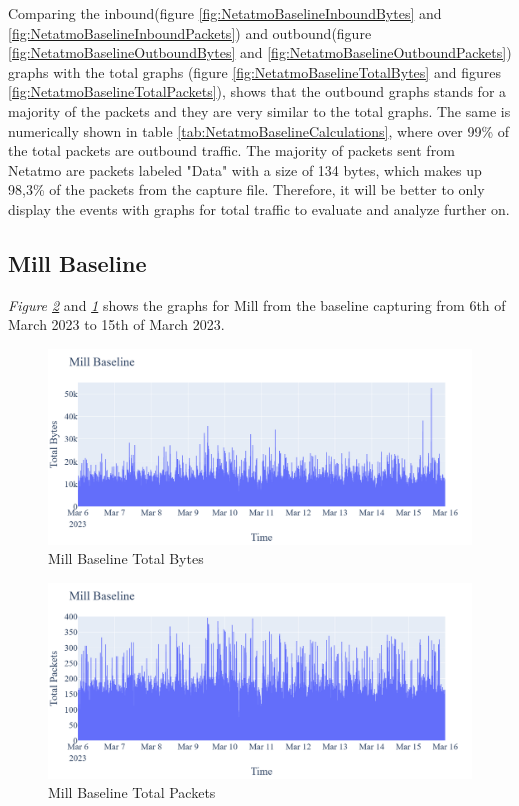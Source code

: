 Comparing the inbound(figure \ref{fig:NetatmoBaselineInboundBytes} and \ref{fig:NetatmoBaselineInboundPackets}) and outbound(figure \ref{fig:NetatmoBaselineOutboundBytes} and \ref{fig:NetatmoBaselineOutboundPackets}) graphs with the total graphs (figure \ref{fig:NetatmoBaselineTotalBytes} and figures \ref{fig:NetatmoBaselineTotalPackets}), shows that the outbound graphs stands for a majority of the packets and they are very similar to the total graphs. The same is numerically shown in table \ref{tab:NetatmoBaselineCalculations}, where over 99\% of the total packets are outbound traffic. The majority of packets sent from Netatmo are packets labeled "Data" with a size of 134 bytes, which makes up 98,3\% of the packets from the capture file. Therefore, it will be better to only display the events with graphs for total traffic to evaluate and analyze further on. 

\subsection{Mill Baseline}
\textit{Figure \ref{fig:MillBaselineTotalPackets}} and \textit{\ref{fig:MillBaselineTotalBytes}} shows the graphs for Mill from the baseline capturing from 6th of March 2023 to 15th of March 2023. 
\begin{figure} [H]
    \centering
    \includegraphics[scale=0.3]{figures/Mill_Baseline_TotalBytes.png}
    \caption{Mill Baseline Total Bytes}
    \label{fig:MillBaselineTotalBytes}
\end{figure}

\begin{figure} [H]
    \centering
    \includegraphics[scale=0.3]{figures/Mill_Baseline_TotalPackets.png}
    \caption{Mill Baseline Total Packets}
    \label{fig:MillBaselineTotalPackets}
 \end{figure}

